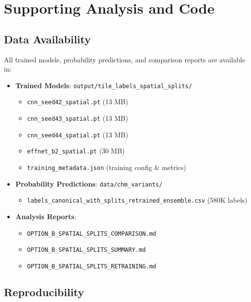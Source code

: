 \pagebreak

\section{Supporting Analysis and Code}

\subsection{Data Availability}

All trained models, probability predictions, and comparison reports are available in:

\begin{itemize}
    \item \textbf{Trained Models}: \texttt{output/tile\_labels\_spatial\_splits/}
          \begin{itemize}
              \item \texttt{cnn\_seed42\_spatial.pt} (13 MB)
              \item \texttt{cnn\_seed43\_spatial.pt} (13 MB)
              \item \texttt{cnn\_seed44\_spatial.pt} (13 MB)
              \item \texttt{effnet\_b2\_spatial.pt} (30 MB)
              \item \texttt{training\_metadata.json} (training config \& metrics)
          \end{itemize}

    \item \textbf{Probability Predictions}: \texttt{data/chm\_variants/}
          \begin{itemize}
              \item \texttt{labels\_canonical\_with\_splits\_retrained\_ensemble.csv} (580K labels)
          \end{itemize}

    \item \textbf{Analysis Reports}:
          \begin{itemize}
              \item \texttt{OPTION\_B\_SPATIAL\_SPLITS\_COMPARISON.md}
              \item \texttt{OPTION\_B\_SPATIAL\_SPLITS\_SUMMARY.md}
              \item \texttt{OPTION\_B\_SPATIAL\_SPLITS\_RETRAINING.md}
          \end{itemize}
\end{itemize}

\subsection{Reproducibility}

